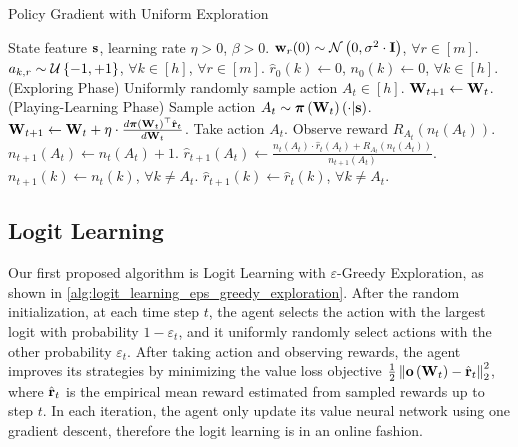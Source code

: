 \begin{algorithm}[t]
   \caption{Policy Gradient with Uniform Exploration}
\label{alg:policy_gradient_uniform_exploration}
\begin{algorithmic}
    State feature ${\mathbf{s}}$, learning rate $\eta > 0$, $\beta > 0$.
   \STATE ${\mathbf{w}}_r(0) \sim {\mathcal{N}}\left( 0, \sigma^2 \cdot {\mathbf{I}} \right)$, $\forall r \in [m]$.
   \STATE $a_{k, r} \sim {\mathcal{U}}\left\{-1, +1\right\}$, $\forall k \in [h]$, $\forall r \in [m]$.
   \STATE $\hat{r}_{0}\left(k\right) \gets 0$, $n_{0}\left(k\right) \gets 0$, $\forall k \in [h]$.
   \STATE (Exploring Phase)
   \STATE Uniformly randomly sample action $A_{t} \in [h]$.
   \STATE ${\mathbf{W}}_{t+1} \leftarrow {\mathbf{W}}_t$.
   \ELSE
   \STATE (Playing-Learning Phase)
   \STATE Sample action $A_{t} \sim {\boldsymbol{\pi}}\left({\mathbf{W}}_t\right)\left(\cdot \middle| {\mathbf{s}} \right)$.
   \STATE ${\mathbf{W}}_{t+1} \leftarrow {\mathbf{W}}_t + \eta \cdot \frac{d {\boldsymbol{\pi}}\left({\mathbf{W}}_t\right)^\top \hat{{\mathbf{r}}}_t}{d {\mathbf{W}}_t}$.
   \ENDIF
   \STATE Take action $A_{t}$. Observe reward $R_{ A_{t}}\left(n_{t}\left(A_t\right) \right)$.
   \STATE $n_{t+1}\left(A_t\right) \gets n_{t}\left(A_t\right) + 1$.
   \STATE $\hat{r}_{t+1}\left(A_t\right) \gets \frac{n_{t}\left(A_t\right) \cdot \hat{r}_{t}\left(A_t\right) + R_{ A_{t}}\left(n_{t}\left(A_t\right)\right) }{n_{t+1}\left(A_t\right)}$.
   \STATE $n_{t+1}\left(k\right) \gets n_{t}\left(k\right)$, $\forall k \not= A_t$.
   \STATE $\hat{r}_{t+1}\left(k\right) \gets \hat{r}_{t}\left(k\right)$, $\forall k \not= A_t$.
   \ENDFOR
\end{algorithmic}
\end{algorithm}

\subsection{Logit Learning}
\label{subsec:logit_learning}

Our first proposed algorithm is Logit Learning with $\varepsilon$-Greedy Exploration, as shown in \cref{alg:logit_learning_eps_greedy_exploration}. After the random initialization, at each time step $t$, the agent selects the action with the largest logit with probability $1 - \varepsilon_t$, and it uniformly randomly select actions with the other probability $\varepsilon_t$. After taking action and observing rewards, the agent improves its strategies by minimizing the value loss objective $\frac{1}{2} \left\| {\mathbf{o}}\left( {\mathbf{W}}_t\right) - \hat{{\mathbf{r}}}_t \right\|_2^2$, where $\hat{{\mathbf{r}}}_t$ is the empirical mean reward estimated from sampled rewards up to step $t$. In each iteration, the agent only update its value neural network using one gradient descent, therefore the logit learning is in an online fashion.


